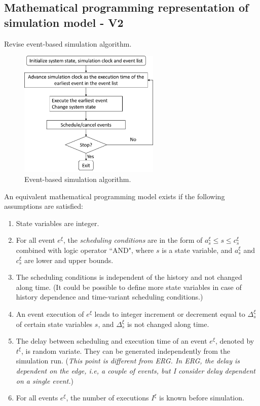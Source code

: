 \documentclass[]{interact}
\theoremstyle{plain}%
\theoremstyle{definition}
\theoremstyle{remark}
\begin{document}
\newpage
\subsection{Mathematical programming representation of simulation model - V2}

Revise event-based simulation algorithm.

\begin{figure}[h]
	\centering
	\includegraphics[width=0.6\textwidth]{Figures/EventSimAlgo.png}
	\caption{Event-based simulation algorithm.}
	\label{fig:EventSimAlgo}
\end{figure}

An equivalent mathematical programming model exists if the following assumptions are satisfied:
\begin{enumerate}
	\item State variables are integer.
	\item For all event $e^{\xi}$, the \textit{scheduling conditions} are in the form of $a^{\xi}_s\le s \le c^{\xi}_s$ combined with logic operator ``AND", where $s$ is a state variable, and $a^{\xi}_s$ and $c^{\xi}_s$ are lower and upper bounds.
	\item The scheduling conditions is independent of the history and not changed along time. (It could be possible to define more state variables in case of history dependence and time-variant scheduling conditions.)
	\item An event execution of $e^{\xi}$ leads to integer increment or decrement equal to $\Delta^{\xi}_s$ of certain state variables $s$, and $\Delta^{\xi}_s$ is not changed along time.
	\item The delay between scheduling and execution time of an event $e^{\xi}$, denoted by $t^{\xi}$, is random variate. They can be generated independently from the simulation run. (\textit{This point is different from ERG. In ERG, the delay is dependent on the edge, i.e, a couple of events, but I consider delay dependent on a single event.})
	\item For all events $e^{\xi}$, the number of executions $I^{\xi}$ is known before simulation.
\end{enumerate}
\end{document}
